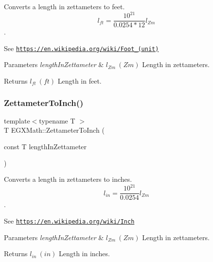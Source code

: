 Converts a length in zettameters to feet. \[ l_{ft}= \frac{10^{21}}{0.0254 * 12} l_{Zm} \]. 

See \href{https://en.wikipedia.org/wiki/Foot_(unit)}{\tt https\+://en.\+wikipedia.\+org/wiki/\+Foot\+\_\+(unit)} 
\begin{DoxyParams}{Parameters}
{\em length\+In\+Zettameter} & $ l_{Zm}\ (Zm)$ Length in zettameters. \\
\hline
\end{DoxyParams}
\begin{DoxyReturn}{Returns}
$ l_{ft}\ (ft)$ Length in feet. 
\end{DoxyReturn}
\mbox{\label{group___e_g_x_math-_conversions-_length_conversions-_zettameter-_imperial_gada0a88ddbf198ca1828b6c39fda34f2c}} 
\subsubsection{\texorpdfstring{Zettameter\+To\+Inch()}{ZettameterToInch()}}
{\footnotesize\ttfamily template$<$typename T $>$ \\
T E\+G\+X\+Math\+::\+Zettameter\+To\+Inch (\begin{DoxyParamCaption}\item[{const T}]{length\+In\+Zettameter }\end{DoxyParamCaption})}



Converts a length in zettameters to inches. \[ l_{in}= \frac{10^{21}}{0.0254} l_{Zm} \]. 

See \href{https://en.wikipedia.org/wiki/Inch}{\tt https\+://en.\+wikipedia.\+org/wiki/\+Inch} 
\begin{DoxyParams}{Parameters}
{\em length\+In\+Zettameter} & $ l_{Zm}\ (Zm)$ Length in zettameters. \\
\hline
\end{DoxyParams}
\begin{DoxyReturn}{Returns}
$ l_{in}\ (in)$ Length in inches. 
\end{DoxyReturn}
\mbox{\label{group___e_g_x_math-_conversions-_length_conversions-_zettameter-_imperial_gad42b99391f53e56136f2411915c5e28d}} 
